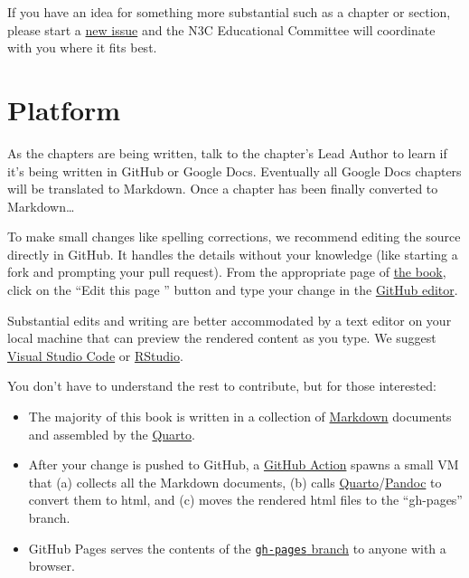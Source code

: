 \documentclass[
  letterpaper,
  DIV=11,
  numbers=noendperiod]{scrreprt}
\begin{document}
If you have an idea for something more substantial such as a chapter or
section, please start a
\href{https://github.com/National-COVID-Cohort-Collaborative/guide-to-n3c-v1/issues}{new
issue} and the N3C Educational Committee will coordinate with you where
it fits best.

\hypertarget{platform}{%
\section*{Platform}\label{platform}}


As the chapters are being written, talk to the chapter's Lead Author to
learn if it's being written in GitHub or Google Docs. Eventually all
Google Docs chapters will be translated to Markdown. Once a chapter has
been finally converted to Markdown\ldots{}

To make small changes like spelling corrections, we recommend editing
the source directly in GitHub. It handles the details without your
knowledge (like starting a fork and prompting your pull request). From
the appropriate page of
\href{https://national-covid-cohort-collaborative.github.io/guide-to-n3c-v1/}{the
book}, click on the ``Edit this page '' button and type your change in
the
\href{https://docs.github.com/en/repositories/working-with-files/managing-files/editing-files}{GitHub
editor}.

Substantial edits and writing are better accommodated by a text editor
on your local machine that can preview the rendered content as you type.
We suggest \href{https://code.visualstudio.com/}{Visual Studio Code} or
\href{https://www.rstudio.com/products/rstudio/}{RStudio}.

You don't have to understand the rest to contribute, but for those
interested:

\begin{itemize}
\item
  The majority of this book is written in a collection of
  \href{https://guides.github.com/features/mastering-markdown/}{Markdown}
  documents and assembled by the \href{https://quarto.org/}{Quarto}.
\item
  After your change is pushed to GitHub, a
  \href{https://docs.github.com/en/actions/learn-github-actions/understanding-github-actions}{GitHub
  Action} spawns a small VM that (a) collects all the Markdown
  documents, (b) calls
  \href{https://quarto.org/}{Quarto}/\href{https://pandoc.org/}{Pandoc}
  to convert them to html, and (c) moves the rendered html files to the
  ``gh-pages'' branch.
\item
  GitHub Pages serves the contents of the
  \href{https://github.com/National-COVID-Cohort-Collaborative/guide-to-n3c-v1/tree/gh-pages}{\texttt{gh-pages}
  branch} to anyone with a browser.
\end{itemize}
\end{document}
